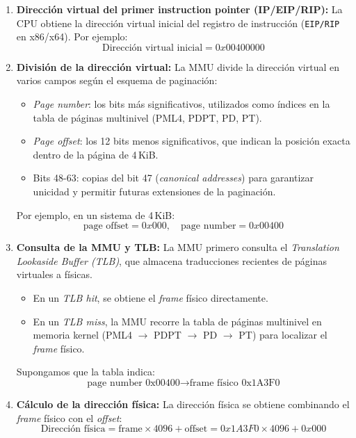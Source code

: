 \begin{enumerate}
    \item \textbf{Dirección virtual del primer instruction pointer (IP/EIP/RIP):}  
    La CPU obtiene la dirección virtual inicial del registro de instrucción (\texttt{EIP/RIP} en x86/x64). Por ejemplo:
    \[
    \text{Dirección virtual inicial} = 0x00400000
    \]

    \item \textbf{División de la dirección virtual:}  
    La MMU divide la dirección virtual en varios campos según el esquema de paginación:
    \begin{itemize}
        \item \textit{Page number}: los bits más significativos, utilizados como índices en la tabla de páginas multinivel (PML4, PDPT, PD, PT).  
        \item \textit{Page offset}: los 12 bits menos significativos, que indican la posición exacta dentro de la página de 4\,KiB.  
        \item Bits 48-63: copias del bit 47 (\textit{canonical addresses}) para garantizar unicidad y permitir futuras extensiones de la paginación.
    \end{itemize}

    Por ejemplo, en un sistema de 4\,KiB:
    \[
    \text{page offset} = 0x000, \quad \text{page number} = 0x00400
    \]

    \item \textbf{Consulta de la MMU y TLB:}  
    La MMU primero consulta el \textit{Translation Lookaside Buffer (TLB)}, que almacena traducciones recientes de páginas virtuales a físicas.  
    \begin{itemize}
        \item En un \textit{TLB hit}, se obtiene el \textit{frame} físico directamente.
        \item En un \textit{TLB miss}, la MMU recorre la tabla de páginas multinivel en memoria kernel (PML4 $\rightarrow$ PDPT $\rightarrow$ PD $\rightarrow$ PT) para localizar el \textit{frame} físico.
    \end{itemize}

    Supongamos que la tabla indica:
    \[
    \text{page number 0x00400} \rightarrow \text{frame físico 0x1A3F0}
    \]

    \item \textbf{Cálculo de la dirección física:}  
    La dirección física se obtiene combinando el \textit{frame} físico con el \textit{offset}:
    \[
    \text{Dirección física} = \text{frame} \times 4096 + \text{offset} = 0x1A3F0 \times 4096 + 0x000
    \]


\end{enumerate}
